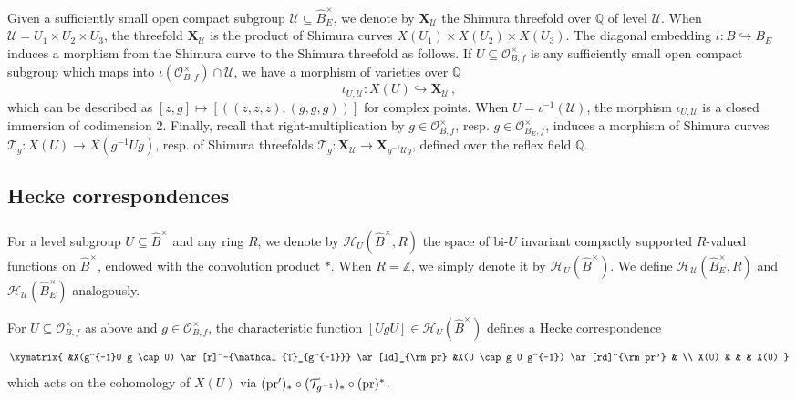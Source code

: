 \documentclass{amsart}
\numberwithin{equation}{section}
\newcommand{\QQ}{\mathbb{Q}}
\newcommand{\ZZ}{\mathbb{Z}}
\newcommand{\cO}{\mathcal{O}}
\begin{document}
\subsubsection{} 

Given a sufficiently small open compact subgroup $\mathcal{U} \subseteq  \widehat{B}_E^{\times}$, we denote by $\mathbf{X}_{\mathcal{U}}$ the Shimura threefold over $\QQ$ of level $\mathcal{U}$. When $\mathcal{U} = U_1 \times U_2 \times U_3$,  the threefold $\mathbf{X}_{\mathcal{U}}$ is the product of Shimura curves $X(U_1) \times X(U_2) \times X(U_3)$. The diagonal embedding $\iota: B \hookrightarrow B_E$ induces a morphism from the Shimura curve to the Shimura threefold as follows. If $U \subseteq \cO_{B,f}^\times$ is any sufficiently small open compact subgroup which maps into $\iota(\cO_{B,f}^\times) \cap  \mathcal{U}$, we have a morphism of varieties over $\QQ$ 
\[ \iota_{U,\mathcal{U}}:X(U) \hookrightarrow \mathbf{X}_{\mathcal{U}}\,,\]
which can be described as $[z,g] \mapsto [((z,z,z),(g,g,g))]$ for complex points. When $U=\iota^{-1}(\mathcal{U})$, the morphism $\iota_{U,\mathcal{U}}$ is a closed immersion of codimension 2.  Finally, recall that right-multiplication by $g  \in \cO_{B,f}^\times$, resp. $g  \in \cO_{B_E,f}^\times$, induces a morphism of Shimura curves $\mathcal{T}_g: X(U) \to X(g^{-1} U g)$, resp. of Shimura threefolds $\mathcal{T}_g: \mathbf{X}_{\mathcal{U}} \to \mathbf{X}_{g^{-1}\mathcal{U}g}$, defined over the reflex field $\QQ$.

\subsection{Hecke correspondences}

\subsubsection{} 
\label{subsubsec_A21_2025_06_30_1533}
For a level subgroup $U \subseteq \widehat{B}^\times$ and any ring $R$, we denote by $\mathcal{H}_U( \widehat{B}^\times,R)$ the space of bi-$U$ invariant compactly supported $R$-valued functions on $\widehat{B}^\times$, endowed with the convolution product $\ast$. When $R=\ZZ$, we simply denote it by $\mathcal{H}_U(\widehat{B}^\times)$. We define $\mathcal{H}_{\mathcal{U}}( \widehat{B}_E^\times,R)$ and $\mathcal{H}_{\mathcal{U}}( \widehat{B}_E^\times)$ analogously. 

For $U \subseteq \mathcal{O}_{B,f}^\times$ as above and $g \in \mathcal{O}_{B,f}^\times$, the characteristic function $[UgU] \in \mathcal{H}_U( \widehat{B}^\times)$ defines a Hecke correspondence 
\[\xymatrix{ 
&X(g^{-1}U g \cap U) \ar[r]^-{\mathcal{T}_{g^{-1}}} \ar[ld]_{\rm pr} &X(U \cap g U g^{-1}) \ar[rd]^{\rm pr'} & \\ X(U)  & & &  X(U)  } \]
which acts on the cohomology of $X(U)$ via $({\rm pr}')_* \circ (\mathcal{T}_{g^{-1}})_* \circ ({\rm pr})^*$. 
\end{document}
